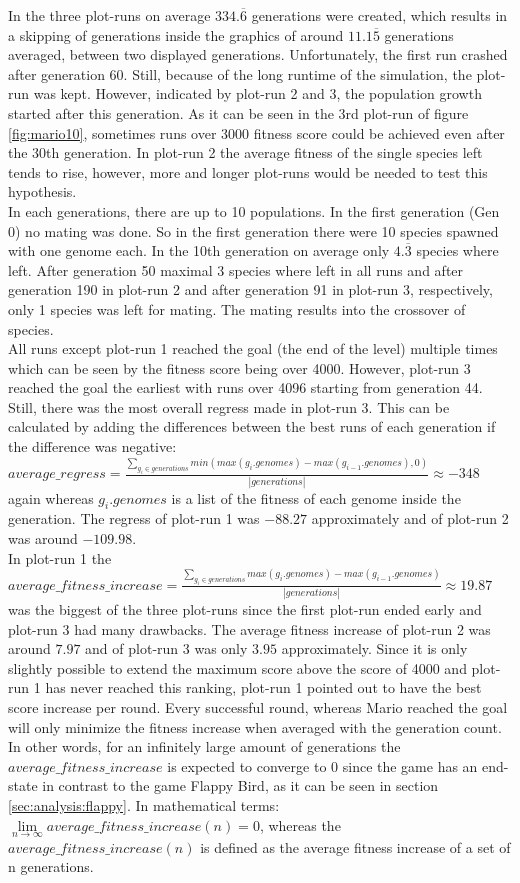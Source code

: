 			In the three plot-runs on average $334.\overline{6}$ generations were created, which results in a skipping of generations inside the graphics of around $11.1\overline{5}$ generations averaged, between two displayed generations. Unfortunately, the first run crashed after generation 60. Still, because of the long runtime of the simulation, the plot-run was kept. However, indicated by plot-run 2 and 3, the population growth started after this generation. As it can be seen in the 3rd plot-run of figure \ref{fig:mario10}, sometimes runs over 3000 fitness score could be achieved even after the 30th generation. In plot-run 2 the average fitness of the single species left tends to rise, however, more and longer plot-runs would be needed to test this hypothesis.\\
			In each generations, there are up to 10 populations.
			In the first generation (Gen 0) no mating was done. So in the first generation there were 10 species spawned with one genome each. In the 10th generation on average only $4.\overline{3}$ species where left. After generation 50 maximal 3 species where left in all runs and after generation 190 in plot-run 2 and after generation 91 in plot-run 3, respectively, only 1 species was left for mating. The mating results into the crossover of species.\\
			All runs except plot-run 1 reached the goal (the end of the level) multiple times which can be seen by the fitness score being over 4000. However, plot-run 3 reached the goal the earliest with runs over 4096 starting from generation 44. Still, there was the most overall regress made in plot-run 3. This can be calculated by adding the differences between the best runs of each generation if the difference was negative: $average\_regress = \frac{\sum\nolimits_{g_i \in generations} min(max(g_i.genomes) - max(g_{i-1}.genomes), 0)}{|generations|}\approx-348$ again whereas $g_i.genomes$ is a list of the fitness of each genome inside the generation. The regress of plot-run 1 was $-88.27$ approximately and of plot-run 2 was around $-109.98$.\\
			In plot-run 1 the $average\_fitness\_increase =  \frac{\sum\nolimits_{g_i \in generations} max(g_i.genomes) - max(g_{i-1}.genomes)}{|generations|}\approx19.87$ was the biggest of the three plot-runs since the first plot-run ended early and plot-run 3 had many drawbacks. The average fitness increase of plot-run 2 was around $7.97$ and of plot-run 3 was only $3.95$ approximately. Since it is only slightly possible to extend the maximum score above the score of 4000 and plot-run 1 has never reached this ranking, plot-run 1 pointed out to have the best score increase per round. Every successful round, whereas Mario reached the goal will only minimize the fitness increase when averaged with the generation count. In other words, for an infinitely large amount of generations the $average\_fitness\_increase$ is expected to converge to $0$ since the game has an end-state in contrast to the game Flappy Bird, as it can be seen in section \ref{sec:analysis:flappy}. In mathematical terms: $\lim\limits_{n \to \infty} average\_fitness\_increase(n) = 0$, whereas the $average\_fitness\_increase(n)$ is defined as the average fitness increase of a set of n generations.
		
